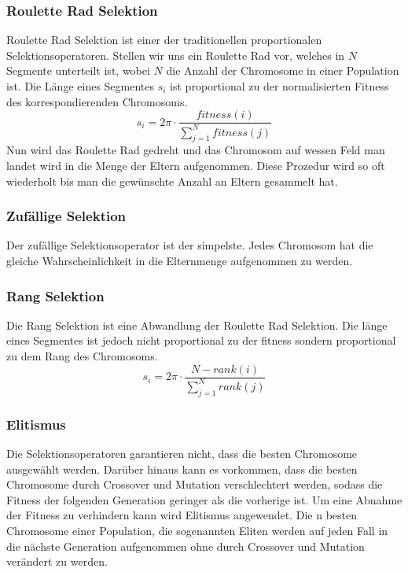 \subsubsection*{Roulette Rad Selektion}
Roulette Rad Selektion ist einer der traditionellen proportionalen Selektionsoperatoren.
Stellen wir uns ein Roulette Rad vor, welches in $N$ Segmente unterteilt ist, 
wobei $N$ die Anzahl der Chromosome in einer Population ist.
Die Länge eines Segmentes $s_i$ ist proportional zu der normalisierten Fitness des korrespondierenden Chromosoms.
\begin{equation}
    s_i = 2 \pi \cdot \frac{fitness(i)}{\sum_{j=1}^{N} fitness(j)}
\end{equation}
Nun wird das Roulette Rad gedreht und das Chromosom auf wessen Feld man landet wird
in die Menge der Eltern aufgenommen.
Diese Prozedur wird so oft wiederholt bis man die gewünschte Anzahl an Eltern gesammelt hat.

\subsubsection*{Zufällige Selektion}
Der zufällige Selektionsoperator ist der simpelste.
Jedes Chromosom hat die gleiche Wahrscheinlichkeit in die Elternmenge aufgenommen zu werden.

\subsubsection*{Rang Selektion}
Die Rang Selektion ist eine Abwandlung der Roulette Rad Selektion.
Die länge eines Segmentes ist jedoch nicht proportional zu der fitness sondern proportional zu dem Rang des Chromosoms.
\begin{equation}
    s_i = 2 \pi \cdot \frac{N - rank(i)}{\sum_{j=1}^{N} rank(j)}
\end{equation}

\subsubsection*{Elitismus}
Die Selektionsoperatoren garantieren nicht, dass die besten Chromosome ausgewählt werden.
Darüber hinaus kann es vorkommen, dass die besten Chromosome durch Crossover und Mutation verschlechtert werden,
sodass die Fitness der folgenden Generation geringer als die vorherige ist.
Um eine Abnahme der Fitness zu verhindern kann wird Elitismus angewendet.
Die n besten Chromosome einer Population, die sogenannten Eliten werden 
auf jeden Fall in die nächste Generation aufgenommen ohne durch Crossover und Mutation verändert zu werden.

